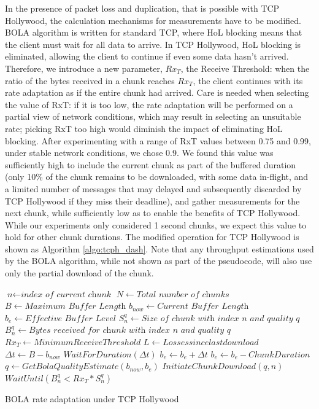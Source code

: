 In the presence of packet loss and duplication, that is possible with TCP Hollywood, the calculation 
mechanisms for measurements have to be modified. BOLA algorithm is written for standard TCP, where HoL blocking means that the client must wait for all data to arrive. In TCP Hollywood, HoL blocking is eliminated, allowing the client to continue if even some data hasn't arrived. Therefore, we introduce a new parameter, $Rx_{T}$, the Receive Threshold: when the ratio of the bytes received in a chunk reaches $Rx_{T}$, the client continues with its rate adaptation as if the entire chunk had arrived. Care is needed when selecting the value of RxT: if it is too low, the rate adaptation will be performed on a partial view of network conditions, which may result in selecting an unsuitable rate; picking RxT too high would diminish the impact of eliminating HoL blocking. After experimenting with a range of RxT values between 0.75 and 0.99, under stable network conditions, we chose 0.9. We found this value was sufficiently high to include the current chunk as part of the buffered duration (only 10\% of the chunk remains to be downloaded, with some data in-flight, and a limited number of messages that may delayed and subsequently discarded by TCP Hollywood if they miss their deadline), and gather measurements for the next chunk, while sufficiently low as to enable the benefits of TCP Hollywood. While our experiments only considered 1 second chunks, we expect this value to hold for other chunk durations. The modified operation for TCP Hollywood is shown as Algorithm \ref{algo:tcph_dash}. Note that any throughput estimations used by the BOLA algorithm, while not shown as part of the pseudocode, will also use only the partial download of the chunk. 

\begin{algorithm}
	\begin{algorithmic}[1]
		\State $\textit{n} \gets \textit{index of current chunk}$
		\State $N \gets \textit{Total number of chunks}$
		\State $B \gets \textit{Maximum Buffer Length}$
		\State $b_{now} \gets \textit{Current Buffer Length}$
		\State $b_{e} \gets \textit{Effective Buffer Level}$
		\State $S_n^q \gets \textit{Size of chunk with index n and quality q}$
		\State $B_n^q  \gets \textit{Bytes received for chunk with index n and quality q }$
		\State $Rx_T \gets Minimum Receive Threshold$
		\State $L \gets Losses since last download$
				\State $\Delta t \gets B - b_{now}$
				\State $WaitForDuration (\Delta t)$
			\EndIf
			\State $b_{e} \gets b_{e} + \Delta t$
				\State $b_{e} \gets b_{e} - ChunkDuration$
			\EndIf
			\State ${q \gets GetBolaQualityEstimate(b_{now},  b_{e})}$		
			\State $InitiateChunkDownload(q, n)$
			\State $WaitUntil (B_n^q < Rx_T * S_n^q)$
		\EndWhile
		\EndProcedure
	\end{algorithmic}
	\caption{BOLA rate adaptation under TCP Hollywood}
	\label{algo:tcph_dash}
\end{algorithm}

